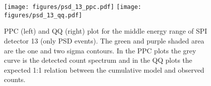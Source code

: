 \documentclass[twocolumn]{aa}
\begin{document}
\begin{appendix}
\begin{figure}[h]
    \begin{centering}
      \texttt{[image: figures/psd\_13\_ppc.pdf]}
      \texttt{[image: figures/psd\_13\_qq.pdf]}
      \caption{PPC (left) and QQ (right) plot for the middle energy range of SPI detector 13 (only PSD events). The green and purple shaded area are the one and two sigma contours. In the PPC plots the grey curve is the detected count spectrum and in the QQ plots the expected 1:1 relation between the cumulative model and observed counts.}
      \label{fig:psd_13_model_check}
    \end{centering}
  \end{figure}
\end{appendix}



\end{document}
